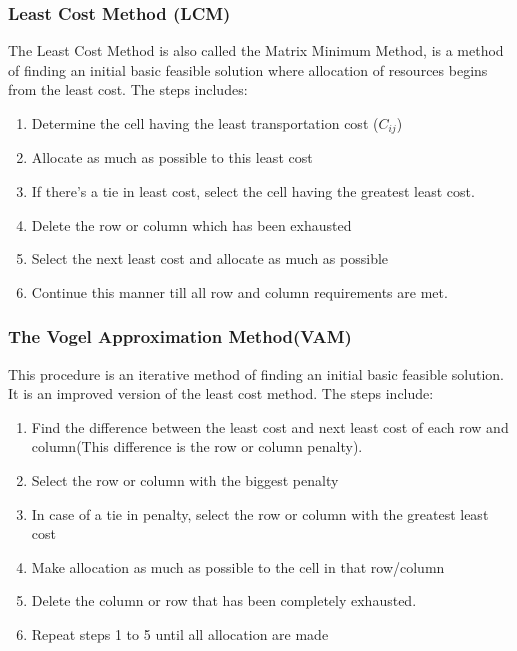 \documentclass[12pt]{report}
\begin{document}
	\subsubsection{Least Cost Method (LCM)}
	The Least Cost Method is also called the Matrix Minimum Method, is a method of finding an initial basic feasible solution where allocation of resources begins from the least cost. The steps includes:
	\begin{enumerate}
		\item Determine the cell having the least transportation cost ($C_{ij}$)
		
		\item Allocate as much as possible to this least cost
		
		\item If there's a tie in least cost, select the cell having the greatest least cost.
		
		\item Delete the row or column which has been exhausted
		
		\item Select the next least cost and allocate as much as possible
		
		\item Continue this manner till all row and column requirements are met.
	\end{enumerate}
	
	\subsubsection{The Vogel Approximation Method(VAM)}
	This procedure is an iterative method of finding an initial basic feasible solution. It is an improved version of the least cost method. The steps include:
	\begin{enumerate}
		\item Find the difference between the least cost and next least cost of each row and column(This difference is the row or column penalty).
		
		\item Select the row or column with the biggest penalty
		
		\item In case of a tie in penalty, select the row or column with the greatest least cost
		
		\item Make allocation as much as possible to the cell in that row/column
		
		\item Delete the column or row that has been completely exhausted.
		
		\item Repeat steps 1 to 5 until all allocation are made
	\end{enumerate}
	
\end{document}
